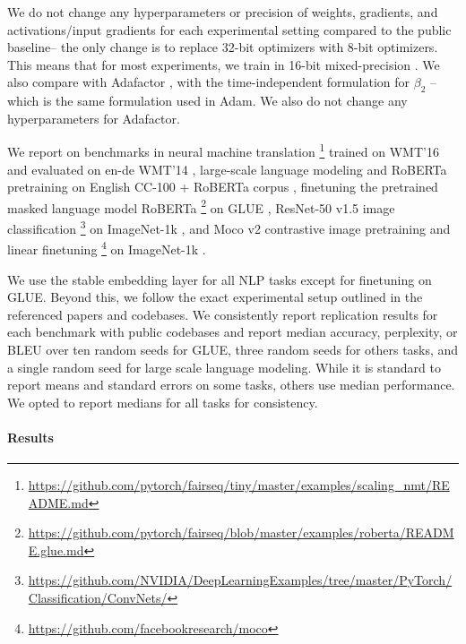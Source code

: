 We do not change any hyperparameters or precision of weights, gradients, and activations/input gradients for each experimental setting compared to the public baseline-- the only change is to replace 32-bit optimizers with 8-bit optimizers. This means that for most experiments, we train in 16-bit mixed-precision \citep{micikevicius2017mixed}. We also compare with Adafactor \citep{shazeer2018adafactor}, with the time-independent formulation for $\beta_2$ \citep{shazeer2018adafactor} -- which is the same formulation used in Adam. We also do not change any hyperparameters for Adafactor.

We report on benchmarks in neural machine translation \citep{ott2018scaling}\footnote{\tiny{\url{https://github.com/pytorch/fairseq/tiny/master/examples/scaling_nmt/README.md}}} trained on WMT'16 \citep{sennrich2016edinburgh} and evaluated on en-de WMT'14 \citep{machavcek2014results}, large-scale language modeling \citep{lewis2021base, brown2020language} and RoBERTa pretraining \citep{liu2019roberta} on English CC-100 + RoBERTa corpus \citep{nagel2016cc,Gokaslan2019OpenWeb,zhu2015aligning,wenzek-etal-2020-ccnet}, finetuning the pretrained masked language model RoBERTa \citep{liu2019roberta}\footnote{\tiny{\url{https://github.com/pytorch/fairseq/blob/master/examples/roberta/README.glue.md}}} on GLUE \citep{wang2018glue}, ResNet-50 v1.5 image classification \citep{he2016deep}\footnote{\tiny{\url{https://github.com/NVIDIA/DeepLearningExamples/tree/master/PyTorch/Classification/ConvNets/}}} on ImageNet-1k \citep{deng2009imagenet}, and Moco v2 contrastive image pretraining and linear finetuning  \citep{chen2020improved}\footnote{\tiny{\url{https://github.com/facebookresearch/moco}}} on ImageNet-1k \citep{deng2009imagenet}. 

We use the stable embedding layer for all NLP tasks except for finetuning on GLUE. Beyond this, we follow the exact experimental setup outlined in the referenced papers and codebases. We consistently report replication results for each benchmark with public codebases and report median accuracy, perplexity, or BLEU over ten random seeds for GLUE, three random seeds for others tasks, and a single random seed for large scale language modeling. While it is standard to report means and standard errors on some tasks, others use median performance. We opted to report medians for all tasks for consistency.

\paragraph{Results}

